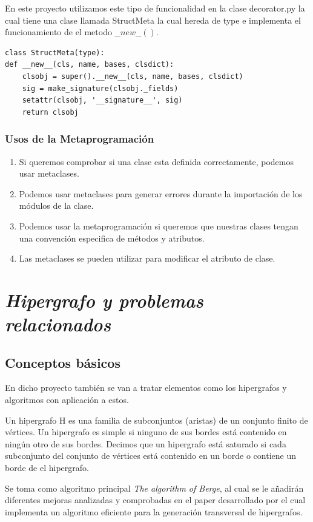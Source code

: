 \documentclass{cosas/tfg_domingo}
\begin{document}
En este proyecto utilizamos este tipo de funcionalidad en la clase decorator.py la cual tiene una clase llamada StructMeta la cual hereda de type e implementa el funcionamiento de el metodo $\_\_new\_\_()$.
\begin{verbatim}
class StructMeta(type):
def __new__(cls, name, bases, clsdict):
    clsobj = super().__new__(cls, name, bases, clsdict)
    sig = make_signature(clsobj._fields)
    setattr(clsobj, '__signature__', sig)
    return clsobj
\end{verbatim}

\subsection{Usos de la Metaprogramación}

\begin{enumerate}
    \item Si queremos comprobar si una clase esta definida correctamente, podemos usar metaclases.
    \item Podemos usar metaclases para generar errores durante la importación de los módulos de la clase.
    \item Podemos usar la metaprogramación si queremos que nuestras clases tengan una convención especifica de métodos y atributos.
    \item Las metaclases se pueden utilizar para modificar el atributo de clase.
    \citep{Farhad}
\end{enumerate}


\chapter{\emph{Hipergrafo y problemas relacionados}}

\section{Conceptos básicos}
En dicho proyecto también se van a tratar elementos como los hipergrafos
y algoritmos con aplicación a estos.

Un hipergrafo H es una familia de subconjuntos (aristas) de un conjunto finito de vértices. Un hipergrafo es simple si ninguno de sus bordes está contenido en ningún otro de sus bordes. Decimos que un hipergrafo está saturado si cada subconjunto del conjunto de vértices está contenido en un borde o contiene un borde de el hipergrafo. \citep{Thomas}

Se toma como algoritmo principal \textit{The algorithm of Berge}, al cual se le añadirán diferentes mejoras analizadas y comprobadas en el paper desarrollado por \citep{JGAA-107} el cual implementa un algoritmo eficiente para la generación transversal de hipergrafos.
\end{document}
